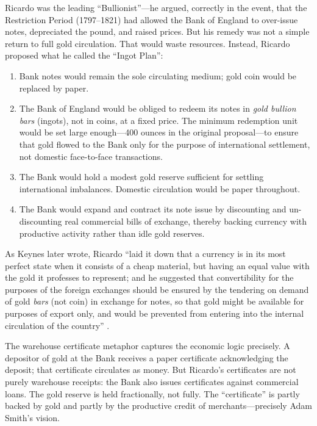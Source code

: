\documentclass[12pt]{article}
\begin{document}
Ricardo was the leading ``Bullionist''---he argued, correctly in the
event, that the Restriction Period (1797--1821) had allowed the Bank
of England to over-issue notes, depreciated the pound, and raised
prices.  But his remedy was not a simple return to full gold
circulation.  That would waste resources.  Instead, Ricardo proposed
what he called the ``Ingot Plan'':

\begin{enumerate}
  \item Bank notes would remain the sole circulating medium; gold
        coin would be replaced by paper.
  \item The Bank of England would be obliged to redeem its notes in
        \emph{gold bullion bars} (ingots), not in coins, at a fixed
        price.  The minimum redemption unit would be set large
        enough---400 ounces in the original proposal---to ensure that
        gold flowed to the Bank only for the purpose of international
        settlement, not domestic face-to-face transactions.
  \item The Bank would hold a modest gold reserve sufficient for
        settling international imbalances.  Domestic circulation
        would be paper throughout.
  \item The Bank would expand and contract its note issue by
        discounting and un-discounting real commercial bills of
        exchange, thereby backing currency with productive activity
        rather than idle gold reserves.
\end{enumerate}

As Keynes later wrote, Ricardo ``laid it down that a currency is in
its most perfect state when it consists of a cheap material, but
having an equal value with the gold it professes to represent; and he
suggested that convertibility for the purposes of the foreign
exchanges should be ensured by the tendering on demand of gold
\emph{bars} (not coin) in exchange for notes, so that gold might be
available for purposes of export only, and would be prevented from
entering into the internal circulation of the country''
\citep[Ch.~II]{Keynes1913}.

The warehouse certificate metaphor captures the economic logic
precisely.  A depositor of gold at the Bank receives a paper
certificate acknowledging the deposit; that certificate circulates
as money.  But Ricardo's certificates are not purely warehouse
receipts: the Bank also issues certificates against commercial
loans.  The gold reserve is held fractionally, not fully.  The
``certificate'' is partly backed by gold and partly by the
productive credit of merchants---precisely Adam Smith's vision.
\end{document}
